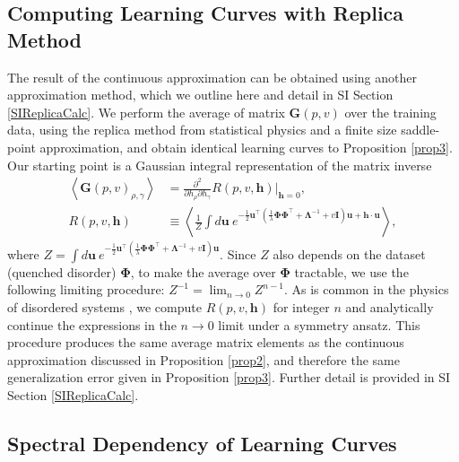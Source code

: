 \documentclass{article}
\begin{document}
\subsection{Computing Learning Curves with Replica Method}\label{sec:main_replica}
The result of the continuous approximation can be obtained using another approximation method, which we outline here and detail in SI Section \ref{SIReplicaCalc}. We perform the average of matrix $\mathbf{G}(p,v)$ over the training data, using the replica method \cite{sherrington_spinglass,mezard1987spin} from statistical physics and a finite size saddle-point approximation, and obtain identical learning curves to Proposition \ref{prop3}. Our starting point is a Gaussian integral representation of the matrix inverse
\begin{align}
    \left< \mathbf{G}(p,v)_{\rho,\gamma} \right> &= \frac{\partial^2}{\partial h_\rho \partial h_\gamma} R(p,v,\mathbf{h}) |_{\mathbf{h}=0}, \nonumber
    \\
    R(p,v,\mathbf{h}) &\equiv \left< \frac{1}{Z} \int d\mathbf{u} \ e^{-\frac{1}{2} \mathbf{u}^\top ( \frac{1}{\lambda} \mathbf{\Phi} \mathbf{\Phi}^\top + \mathbf{\Lambda}^{-1} + v \mathbf{I} ) \mathbf{u} + \mathbf{h} \cdot \mathbf{u}}  \right>,
\end{align}
%
where  $Z = \int d\mathbf{u} \ e^{-\frac{1}{2} \mathbf{u}^\top ( \frac{1}{\lambda} \mathbf{\Phi} \mathbf{\Phi}^\top + \mathbf{\Lambda}^{-1} + v \mathbf{I} ) \mathbf{u}}$. Since $Z$ also depends on the dataset (quenched disorder) $\mathbf{\Phi}$,  to make the average over $\mathbf{\Phi}$ tractable, we use the following limiting procedure: $Z^{-1} = \lim_{n \to 0} Z^{n-1}$. As is common in the physics of disordered systems \cite{mezard1987spin}, we compute $R(p,v,\mathbf{h})$ for integer $n$ and analytically continue the expressions in the $n \to 0$ limit under a symmetry ansatz. This procedure produces the same average matrix elements as the continuous approximation discussed in Proposition \ref{prop2}, and therefore the same generalization error given in Proposition \ref{prop3}. Further detail is provided in SI Section \ref{SIReplicaCalc}.



\subsection{Spectral Dependency of Learning Curves}\label{sec:spectral}
\end{document}
